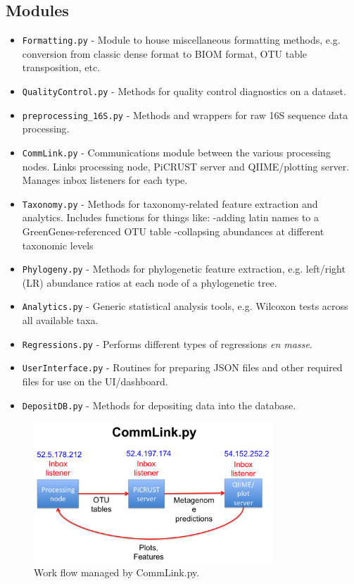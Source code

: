\documentclass[11pt, oneside]{article}   	%
\begin{document}
\subsection{Modules}
\begin{itemize}
  \item {\tt Formatting.py} - Module to house miscellaneous formatting methods, e.g. conversion from classic dense format to BIOM format, OTU table transposition, etc.
	\item {\tt QualityControl.py} - Methods for quality control diagnostics on a dataset.
	\item {\tt preprocessing\_16S.py} - Methods and wrappers for raw 16S sequence data processing.
	\item {\tt CommLink.py} - Communications module between the various processing nodes.  Links processing node, PiCRUST server and QIIME/plotting server.  Manages inbox listeners for each type.
	\item {\tt Taxonomy.py} - Methods for taxonomy-related feature extraction and analytics.  Includes functions for things like:
		-adding latin names to a GreenGenes-referenced OTU table
		-collapsing abundances at different taxonomic levels
	\item {\tt Phylogeny.py} - Methods for phylogenetic feature extraction, e.g. left/right (LR) abundance ratios at each node of a phylogenetic tree.
	\item {\tt Analytics.py} - Generic statistical analysis tools, e.g. Wilcoxon tests across all available taxa.
	\item {\tt Regressions.py} - Performs different types of regressions \textit{en masse}.
	\item {\tt UserInterface.py} - Routines for preparing JSON files and other required files for use on the UI/dashboard.
	\item {\tt DepositDB.py} - Methods for depositing data into the database.
\end{itemize}

\begin{figure}
\centering
	\includegraphics[width=0.8\textwidth]{figs/CommLink.png}
\caption{Work flow managed by CommLink.py.}
\end{figure}
\end{document}
